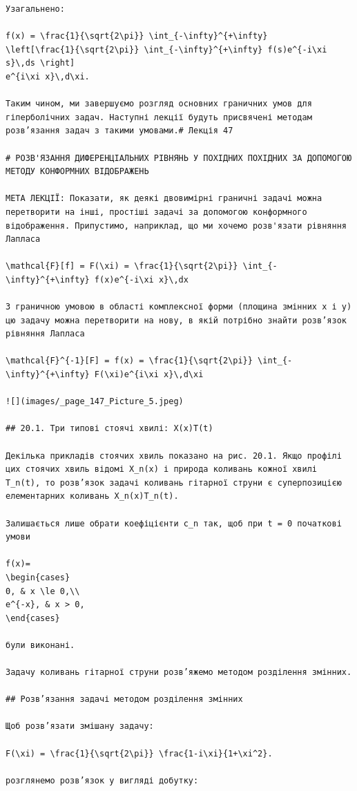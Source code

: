 \documentclass[
  ukrainian,
]{article}
\begin{document}
\begin{verbatim}
Узагальнено:

f(x) = \frac{1}{\sqrt{2\pi}} \int_{-\infty}^{+\infty}
\left[\frac{1}{\sqrt{2\pi}} \int_{-\infty}^{+\infty} f(s)e^{-i\xi s}\,ds \right]
e^{i\xi x}\,d\xi.

Таким чином, ми завершуємо розгляд основних граничних умов для гіперболічних задач. Наступні лекції будуть присвячені методам розв’язання задач з такими умовами.# Лекція 47

# РОЗВ'ЯЗАННЯ ДИФЕРЕНЦІАЛЬНИХ РІВНЯНЬ У ПОХІДНИХ ПОХІДНИХ ЗА ДОПОМОГОЮ МЕТОДУ КОНФОРМНИХ ВІДОБРАЖЕНЬ

МЕТА ЛЕКЦІЇ: Показати, як деякі двовимірні граничні задачі можна перетворити на інші, простіші задачі за допомогою конформного відображення. Припустимо, наприклад, що ми хочемо розв'язати рівняння Лапласа

\mathcal{F}[f] = F(\xi) = \frac{1}{\sqrt{2\pi}} \int_{-\infty}^{+\infty} f(x)e^{-i\xi x}\,dx

З граничною умовою в області комплексної форми (площина змінних x і y) цю задачу можна перетворити на нову, в якій потрібно знайти розв’язок рівняння Лапласа

\mathcal{F}^{-1}[F] = f(x) = \frac{1}{\sqrt{2\pi}} \int_{-\infty}^{+\infty} F(\xi)e^{i\xi x}\,d\xi

![](images/_page_147_Picture_5.jpeg)

## 20.1. Три типові стоячі хвилі: X(x)T(t)

Декілька прикладів стоячих хвиль показано на рис. 20.1. Якщо профілі цих стоячих хвиль відомі X_n(x) і природа коливань кожної хвилі T_n(t), то розв’язок задачі коливань гітарної струни є суперпозицією елементарних коливань X_n(x)T_n(t).

Залишається лише обрати коефіцієнти c_n так, щоб при t = 0 початкові умови

f(x)=
\begin{cases}
0, & x \le 0,\\
e^{-x}, & x > 0,
\end{cases}

були виконані.

Задачу коливань гітарної струни розв’яжемо методом розділення змінних.

## Розв’язання задачі методом розділення змінних

Щоб розв’язати змішану задачу:

F(\xi) = \frac{1}{\sqrt{2\pi}} \frac{1-i\xi}{1+\xi^2}.

розглянемо розв’язок у вигляді добутку:


\end{verbatim}
\end{document}
